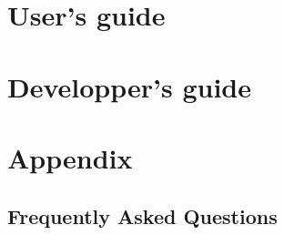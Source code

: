 \documentclass{InsightSoftwareGuide}
\newif\ifitkPrintedVersion
\begin{document}





\part{User's guide}













\part{Developper's guide}




\part{Appendix}
\chapter{Frequently Asked Questions}
\label{sec:FrequentlyAskedQuestions}

\backmatter

%
%





%
%



\end{document}
